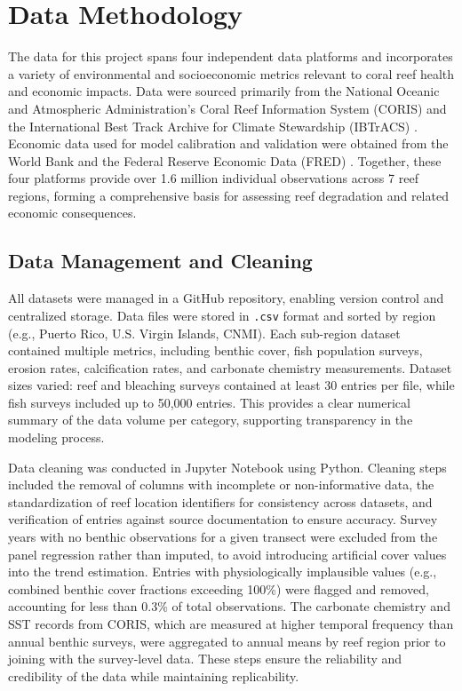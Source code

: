 \documentclass[10pt,letterpaper]{article}
\begin{document}
\section{Data Methodology}

The data for this project spans four independent data platforms and incorporates a variety of environmental and socioeconomic metrics relevant to coral reef health and economic impacts. Data were sourced primarily from the National Oceanic and Atmospheric Administration's Coral Reef Information System (CORIS) and the International Best Track Archive for Climate Stewardship (IBTrACS) \cite{noaa_coris, ibtracs}. Economic data used for model calibration and validation were obtained from the World Bank and the Federal Reserve Economic Data (FRED) \cite{world_bank, fred}. Together, these four platforms provide over 1.6 million individual observations across 7 reef regions, forming a comprehensive basis for assessing reef degradation and related economic consequences.

\subsection{Data Management and Cleaning}

All datasets were managed in a GitHub repository, enabling version control and centralized storage. Data files were stored in \texttt{.csv} format and sorted by region (e.g., Puerto Rico, U.S. Virgin Islands, CNMI). Each sub-region dataset contained multiple metrics, including benthic cover, fish population surveys, erosion rates, calcification rates, and carbonate chemistry measurements. Dataset sizes varied: reef and bleaching surveys contained at least 30 entries per file, while fish surveys included up to 50,000 entries. This provides a clear numerical summary of the data volume per category, supporting transparency in the modeling process.

Data cleaning was conducted in Jupyter Notebook using Python. Cleaning steps included the removal of columns with incomplete or non-informative data, the standardization of reef location identifiers for consistency across datasets, and verification of entries against source documentation to ensure accuracy. Survey years with no benthic observations for a given transect were excluded from the panel regression rather than imputed, to avoid introducing artificial cover values into the trend estimation. Entries with physiologically implausible values (e.g., combined benthic cover fractions exceeding 100\%) were flagged and removed, accounting for less than 0.3\% of total observations. The carbonate chemistry and SST records from CORIS, which are measured at higher temporal frequency than annual benthic surveys, were aggregated to annual means by reef region prior to joining with the survey-level data. These steps ensure the reliability and credibility of the data while maintaining replicability.
\end{document}

